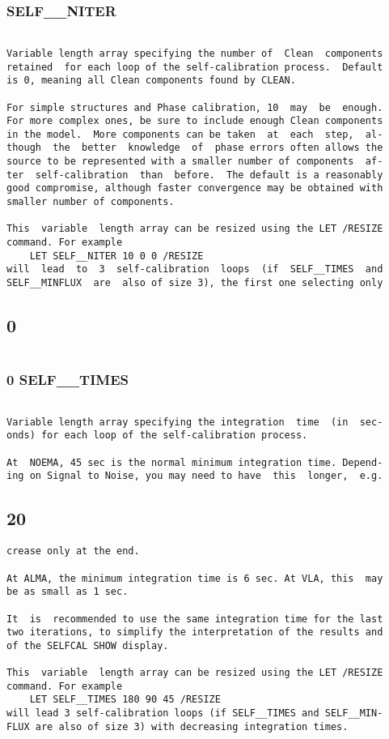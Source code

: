 \subsubsection{SELF\_\_NITER}
\begin{verbatim}

Variable length array specifying the number of  Clean  components
retained  for each loop of the self-calibration process.  Default
is 0, meaning all Clean components found by CLEAN.

For simple structures and Phase calibration, 10  may  be  enough.
For more complex ones, be sure to include enough Clean components
in the model.  More components can be taken  at  each  step,  al-
though  the  better  knowledge  of  phase errors often allows the
source to be represented with a smaller number of components  af-
ter  self-calibration  than  before.  The default is a reasonably
good compromise, although faster convergence may be obtained with
smaller number of components.

This  variable  length array can be resized using the LET /RESIZE
command. For example
    LET SELF__NITER 10 0 0 /RESIZE
will  lead  to  3  self-calibration  loops  (if  SELF__TIMES  and
SELF__MINFLUX  are  also of size 3), the first one selecting only
\end{verbatim}
\subsection{0}
\begin{verbatim}

\end{verbatim}
\subsubsection{0 SELF\_\_TIMES}
\begin{verbatim}

Variable length array specifying the integration  time  (in  sec-
onds) for each loop of the self-calibration process.

At  NOEMA, 45 sec is the normal minimum integration time. Depend-
ing on Signal to Noise, you may need to have  this  longer,  e.g.
\end{verbatim}
\subsection{20}
\begin{verbatim}
crease only at the end.

At ALMA, the minimum integration time is 6 sec. At VLA, this  may
be as small as 1 sec.

It  is  recommended to use the same integration time for the last
two iterations, to simplify the interpretation of the results and
of the SELFCAL SHOW display.

This  variable  length array can be resized using the LET /RESIZE
command. For example
    LET SELF__TIMES 180 90 45 /RESIZE
will lead 3 self-calibration loops (if SELF__TIMES and SELF__MIN-
FLUX are also of size 3) with decreasing integration times.

\end{verbatim}
